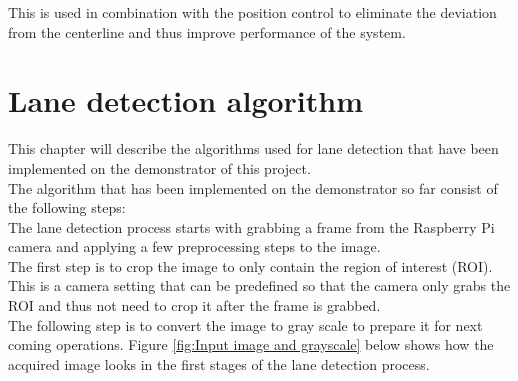 This is used in combination with the position control to eliminate the deviation from the centerline and thus improve performance of the system.


\section{Lane detection algorithm}
This chapter will describe the algorithms used for lane detection that have been implemented on the demonstrator of this project.\\

The algorithm that has been implemented on the demonstrator so far consist of the following steps:\\

The lane detection process starts with grabbing a frame from the Raspberry Pi camera and applying a few preprocessing steps to the image.\\

The first step is to crop the image to only contain the region of interest (ROI). This is a camera setting that can be predefined so that the camera only grabs the ROI and thus not need to crop it after the frame is grabbed.\\

The following step is to convert the image to gray scale to prepare it for next coming operations. Figure \ref{fig:Input image and grayscale} below shows how the acquired image looks in the first stages of the lane detection process.

